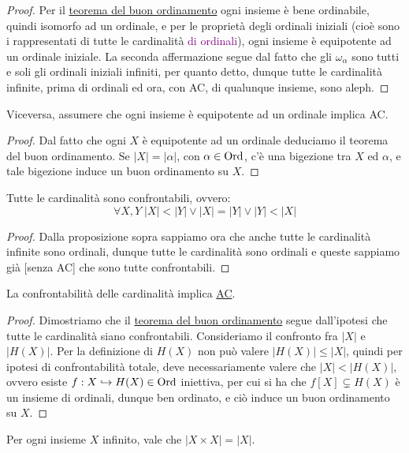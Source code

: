 \begin{proof}
	Per il \hyperref[buon_ordinamento]{teorema del buon ordinamento} ogni insieme \`e bene ordinabile, quindi isomorfo ad un ordinale, e per le propriet\`a
	degli ordinali iniziali (cio\`e sono i rappresentati di tutte le cardinalit\`a \textcolor{purple}{di ordinali}), ogni insieme \`e equipotente ad un ordinale iniziale.
	La seconda affermazione segue dal fatto che gli $\omega_\alpha$ sono tutti e soli gli ordinali iniziali infiniti, per quanto detto, dunque tutte le cardinalit\`a infinite, prima di ordinali ed ora,
	con AC, di qualunque insieme, sono aleph.
\end{proof}

\begin{remark}
	Viceversa, assumere che ogni insieme \`e equipotente ad un ordinale implica AC.
\end{remark}

\begin{proof}
	Dal fatto che ogni $X$ \`e equipotente ad un ordinale deduciamo il teorema del buon ordinamento. Se $|X| = |\alpha|$, con $\alpha \in \operatorname{Ord}$, c'\`e una bigezione tra $X$ ed $\alpha$, e tale bigezione induce un buon ordinamento su $X$.
\end{proof}

\begin{corollary}
	Tutte le cardinalit\`a sono confrontabili, ovvero:
	\[ \forall X,Y \; |X| < |Y| \lor |X| = |Y| \lor |Y| < |X|
		\]
\end{corollary}

\begin{proof}
	Dalla proposizione sopra sappiamo ora che anche tutte le cardinalit\`a infinite sono ordinali, dunque tutte le cardinalit\`a sono ordinali e queste sappiamo gi\`a [senza AC] che sono tutte confrontabili.
\end{proof}

\begin{remark}
	La confrontabilit\`a delle cardinalit\`a implica \hyperref[ax9]{AC}.
\end{remark}

\begin{proof}
	Dimostriamo che il \hyperref[buon_ordinamento]{teorema del buon ordinamento} segue dall'ipotesi che tutte le cardinalit\`a siano confrontabili. Consideriamo il confronto fra $|X|$ e $|H(X)|$.
	Per la definizione di $H(X)$ non pu\`o valere $|H(X)| \leq |X|$, quindi per ipotesi di confrontabilit\`a totale, deve necessariamente valere che $|X| < |H(X)|$, ovvero esiste $f : X \hookrightarrow H(X) \in \operatorname{Ord}$ iniettiva,
	per cui si ha che $f[X] \subsetneq H(X)$ \`e un insieme di ordinali, dunque ben ordinato, e ci\`o induce un buon ordinamento su $X$.
\end{proof}
\pagebreak
\begin{corollary}[AC $\implies |X \times X| = |X|$]
	Per ogni insieme $X$ infinito, vale che $|X \times X| = |X|$.
\end{corollary}

